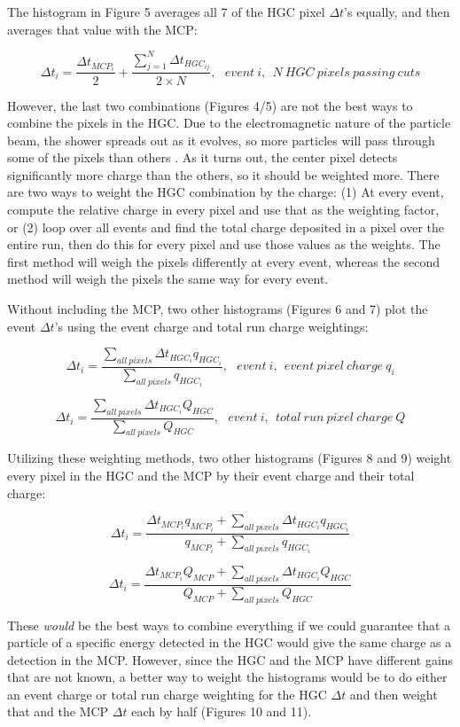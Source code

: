 \documentclass[12pt]{article}
\begin{document}
	The histogram  in Figure 5 averages all 7 of the HGC pixel $\Delta t$’s equally, and then averages that value with the MCP:

\[
\Delta t_i = \dfrac{ \Delta t_{MCP_i} }{2} + \dfrac{\sum_{j=1}^N \Delta t_{HGC_{ij}} }{2\times N},\ \ \ event\ i,\ \ N\ HGC\ pixels\ passing\ cuts
\]

However, the last two combinations (Figures 4/5) are not the best ways to combine the pixels in the HGC. 
Due to the electromagnetic nature of the particle beam, the shower spreads out as it evolves, so more particles will pass through some of the pixels than others \cite{P2}. 
As it turns out, the center pixel detects significantly more charge than the others, so it should be weighted more. 
There are two ways to weight the HGC combination by the charge: (1) At every event, compute the relative charge in every pixel and use that as the weighting factor, or (2) loop over all events and find the total charge deposited in a pixel over the entire run, then do this for every pixel and use those values as the weights. 
The first method will weigh the pixels differently at every event, whereas the second method will weigh the pixels the same way for every event.

Without including the MCP, two other histograms (Figures 6 and 7) plot the event $\Delta t$’s using the event charge and total run charge weightings:

\[
\Delta t_i = 
\dfrac{ \sum\limits_{all\ pixels} \Delta t_{HGC_i} q_{HGC_i} }
	{ \sum\limits_{all\ pixels} q_{HGC_i} }
,\ \ \ event\ i
,\ \ event\ pixel\ charge\ q_i
\]

\[
\Delta t_i = 
\dfrac{ \sum\limits_{all\ pixels} \Delta t_{HGC_i} Q_{HGC} }
	{ \sum\limits_{all\ pixels} Q_{HGC} }
,\ \ \ event\ i
,\ \ total\ run\ pixel\ charge\ Q
\]

Utilizing these weighting methods, two other histograms (Figures 8 and 9) weight every pixel in the HGC and the MCP by their event charge and their total charge:

\[
\Delta t_i = 
\dfrac{ \Delta t_{MCP_i} q_{MCP_i} +
	\sum\limits_{all\ pixels} \Delta t_{HGC_i} q_{HGC_i} }
	{ q_{MCP_i} +
	\sum\limits_{all\ pixels} q_{HGC_i} }
\]

\[
\Delta t_i = 
\dfrac{ \Delta t_{MCP_i} Q_{MCP} +
	\sum\limits_{all\ pixels} \Delta t_{HGC_i} Q_{HGC} }
	{ Q_{MCP} +
	\sum\limits_{all\ pixels} Q_{HGC} }
\]

These \textit{would} be the best ways to combine everything if we could guarantee that a particle of a specific energy detected in the HGC would give the same charge as a detection in the MCP. 
However, since the HGC and the MCP have different gains that are not known, a better way to weight the histograms would be to do either an event charge or total run charge weighting for the HGC $\Delta t$ and then weight that and the MCP $\Delta t$ each by half (Figures 10 and 11).
\end{document}
